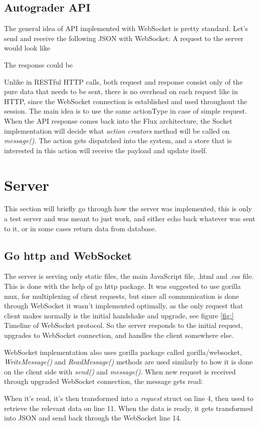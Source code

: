 \subsection{Autograder API}\label{sec:autograderapi}
The general idea of API implemented with WebSocket is pretty standard. Let's send and receive the following JSON with WebSocket:
A request to the server would look like 

The response could be

Unlike in RESTful HTTP calls, both request and response consist only of the pure data that needs to be sent, there is no overhead on each request like in HTTP, since the WebSocket connection is established and used throughout the session. The main idea is to use the same actionType in case of simple request. When the API response comes back into the Flux architecture, the Socket implementation will decide what \emph{action creators} method will be called on \emph{message()}. The action gets dispatched into the system, and a store that is interested in this action will receive the payload and update itself.
\newpage

\section{Server}\label{sec:serverimplementation}
This section will briefly go through how the server was implemented, this is only a test server and was meant to just work, and either echo back whatever was sent to it, or in some cases return data from database.
\subsection{Go http and WebSocket}\label{sec:gohttpws}
The server is serving only static files, the main JavaScript file, .html and .css file. This is done with the help of go http package. It was suggested to use gorilla mux, for multiplexing of client requests, but since all communication is done through WebSocket it wasn't implemented optimally, as the only request that client makes normally is the initial handshake and upgrade, see figure \ref{fig:} Timeline of WebSocket protocol. So the server responds to the initial request, upgrades to WebSocket connection, and handles the client somewhere else.

WebSocket implementation also uses gorilla package called gorilla/websocket, \emph{WriteMessage()} and \emph{ReadMessage()} methods are used similarly to how it is done on the client side with \emph{send()} and \emph{message()}. When new request is received through upgraded WebSocket connection, the message gets read:

When it's read, it's then transformed into a \emph{request} struct on line 4, then used to retrieve the relevant data on line 11. When the data is ready, it gets transformed into JSON and send back through the WebSocket line 14.

